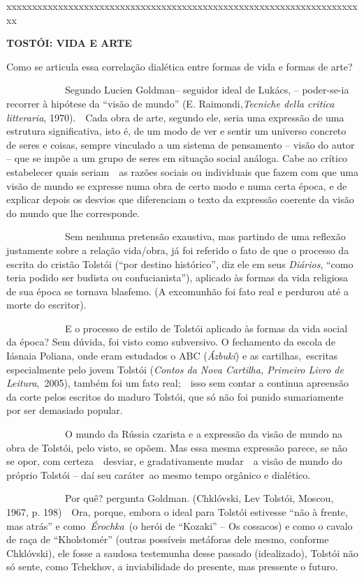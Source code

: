 xxxxxxxxxxxxxxxxxxxxxxxxxxxxxxxxxxxxxxxxxxxxxxxxxxxxxxxxxxxxxxxxxxxxxx

\textbf{TOSTÓI: VIDA E ARTE}

Como se articula essa correlação dialética entre formas de vida e formas
de arte?

~~~~~~~~~~~~Segundo Lucien Goldman-- seguidor ideal de Lukács, --
poder-se-ia recorrer à hipótese da ``visão de mundo'' (E.
Raimondi,\emph{Tecniche della critica litteraria}, 1970).~~Cada obra de
arte, segundo ele, seria uma expressão de uma estrutura significativa,
isto é, de um modo de ver e sentir um universo concreto de seres e
coisas, sempre vinculado a um sistema de pensamento -- visão do autor --
que se impõe a um grupo de seres em situação social análoga. Cabe ao
crítico estabelecer quais seriam~~as razões sociais ou individuais que
fazem com que uma visão de mundo se expresse numa obra de certo modo e
numa certa época, e de explicar depois os desvios que diferenciam o
texto da expressão coerente da visão do mundo que lhe corresponde.

~~~~~~~~~~~~Sem nenhuma pretensão exaustiva, mas partindo de uma
reflexão justamente sobre a relação vida/obra, já foi referido o fato de
que o processo da escrita do cristão Tolstói (``por destino histórico'',
diz ele em seus \emph{Diários}, ``como teria podido ser budista ou
confucianista''), aplicado às formas da vida religiosa de sua época se
tornava blasfemo. (A excomunhão foi fato real e perdurou até a morte do
escritor).

~~~~~~~~~~~~E o processo de estilo de Tolstói aplicado às formas da vida
social da época? Sem dúvida, foi visto como subversivo. O fechamento da
escola de Iásnaia Poliana, onde eram estudados o ABC (\emph{Ázbuki}) e
as cartilhas,~escritas especialmente pelo jovem Tolstói (\emph{Contos da
Nova Cartilha, Primeiro Livro de Leitura},\emph{~}2005), também foi um
fato real;~~isso sem contar a continua apreensão da corte pelos escritos
do maduro Tolstói, que só não foi punido sumariamente por ser demasiado
popular.

~~~~~~~~~~~~O mundo da Rússia czarista e a expressão da visão de mundo
na obra de Tolstói, pelo visto, se opõem. Mas essa mesma expressão
parece, se não se opor, com certeza~~desviar, e gradativamente mudar~~a
visão de mundo do próprio Tolstói -- daí seu caráter~ao mesmo tempo
orgânico e dialético.

~~~~~~~~~~~~Por quê? pergunta Goldman. (Chklóvski, Lev Tolstói, Moscou,
1967, p. 198)~~Ora, porque, embora o ideal para Tolstói estivesse ``não
à frente, mas atrás'' e como~\emph{Érochka}~(o herói de ``Kozaki'' -- Os
cossacos) e como o cavalo de raça de ``Kholstomér'' (outras possíveis
metáforas dele mesmo, conforme Chklóvski), ele fosse a saudosa
testemunha desse passado (idealizado), Tolstói não só sente, como
Tchekhov, a inviabilidade do presente, mas pressente o futuro.

